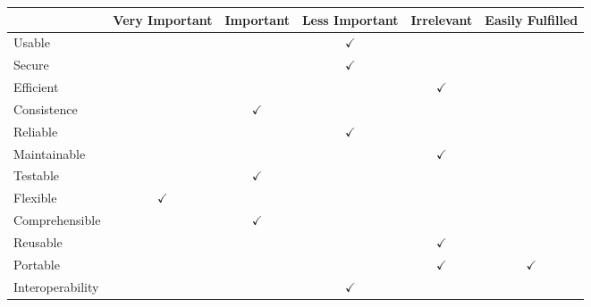 \begin{figure}[h]
	\centering
		\begin{tabular}{| l | m{} | m{}| m{}| m{}|m{}|} \hline
												& Very  Important 												& Important 														& Less Important 											& Irrelevant 												& Easily Fulfilled 									\\ \hline
		Usable  						& 																				& 												& \multicolumn{1}{c|}{$\checkmark$}		& 																	& 																	\\ \hline
		Secure  						& 																				& 																			& \multicolumn{1}{c|}{$\checkmark$} 	& 																	& 																	\\ \hline
		Efficient 					& 																				& 																			& 																		& \multicolumn{1}{c|}{$\checkmark$} & 																	\\ \hline
		Consistence  				& 																				& \multicolumn{1}{c|}{$\checkmark$} 		& 																		& 																	& 																	\\ \hline
		Reliable  					& 																				& 																			& \multicolumn{1}{c|}{$\checkmark$} 	& 																	& 																	\\ \hline
		Maintainable  			& 																				& 																			& 																		& \multicolumn{1}{c|}{$\checkmark$} & 																	\\ \hline
		Testable  					& 																				& \multicolumn{1}{c|}{$\checkmark$} 		& 																		& 																	& 																	\\ \hline
		Flexible  					& \multicolumn{1}{c|}{$\checkmark$} 			& 																			& 																		& 																	& 																	\\ \hline
		Comprehensible  		& 																				& \multicolumn{1}{c|}{$\checkmark$} 		& 																		& 																	& 																	\\ \hline
		Reusable  					& 																				& 																			& 																		& \multicolumn{1}{c|}{$\checkmark$} & 																	\\ \hline
		Portable 						& 																				& 																			& 																		& \multicolumn{1}{c|}{$\checkmark$} &	\multicolumn{1}{c|}{$\checkmark$} \\ \hline
		Interoperability 		& 																				& 																			& \multicolumn{1}{c|}{$\checkmark$} 	& 																	& 																	\\ \hline
		\end{tabular}
	\label{fig:prioritizedCrit}
\end{figure}


